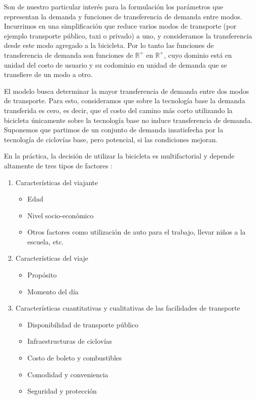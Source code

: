 
Son de nuestro particular interés para la formulación los parámetros que representan la demanda y funciones de transferencia de demanda entre modos. Incurrimos en una simplificación que reduce varios modos de transporte (por ejemplo transporte público, taxi o privado) a uno, y consideramos la transferencia desde este modo agregado a la bicicleta. Por lo tanto las funciones de transferencia de demanda son funciones de $\mathbb{R}^+$ en $\mathbb{R}^+$, cuyo dominio está en unidad del costo de usuario y su codominio en unidad de demanda que se transfiere de un modo a otro.

El modelo busca determinar la mayor transferencia de demanda entre dos modos de transporte. Para esto, consideramos que sobre la tecnología base la demanda transferida es cero, es decir, que el costo del camino más corto utilizando la bicicleta únicamente sobre la tecnología base no induce transferencia de demanda. Suponemos que partimos de un conjunto de demanda insatisfecha por la tecnología de ciclovías base, pero potencial, si las condiciones mejoran.

En la práctica, la decisión de utilizar la bicicleta es multifactorial y depende altamente de tres tipos de factores \citep{ortuz2011}:

\begin{enumerate}
  \item{
      Características del viajante
        \begin{itemize}
          \item{Edad}
          \item{Nivel socio-económico}
          \item{Otros factores como utilización de auto para el trabajo, llevar niños a la escuela, etc.}
        \end{itemize}
  }
  \item{
      Características del viaje
        \begin{itemize}
          \item{Propósito}
          \item{Momento del día}
        \end{itemize}
  }
\item{\label{bicycleusagefactors}
      Características cuantitativas y cualitativas de las facilidades de transporte
      \begin{itemize}
          \item{Disponibilidad de transporte público}
          \item{Infraestructuras de ciclovías}
          \item{Costo de boleto y combustibles}
          \item{Comodidad y conveniencia}
          \item{Seguridad y protección}
      \end{itemize}
  }
\end{enumerate}

